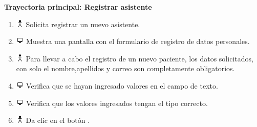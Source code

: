 \textbf{Trayectoria principal: Registrar asistente}  
\begin{enumerate}
\item \includegraphics[height=1em]{pictures/actor.png} Solicita registrar un nuevo asistente.
\item \includegraphics[height=1em]{pictures/sistema.png} Muestra una pantalla con el formulario de registro de datos personales.
\item \includegraphics[height=1em]{pictures/actor.png} Para llevar a cabo el registro de un nuevo paciente, los datos solicitados, con solo el nombre,apellidos y correo son completamente obligatorios.
\item \includegraphics[height=1em]{pictures/sistema.png} Verifica que se hayan ingresado valores en el campo de texto.
\item \includegraphics[height=1em]{pictures/sistema.png} Verifica que los valores ingresados tengan el tipo correcto.
\item \includegraphics[height=1em]{pictures/actor.png} Da clic en el botón .
\end{enumerate} \bigskip

